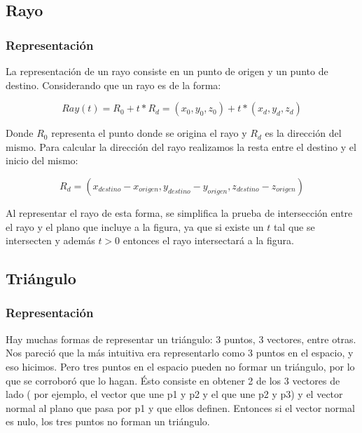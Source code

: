 \documentclass[a4paper,10pt]{article}
\begin{document}
\subsection{Rayo}

\subsubsection{Representaci\'on}

La representaci\'on de un rayo consiste en un punto de origen y un punto de destino.  Considerando que un rayo es de la forma:

\begin{center}
  \begin{equation}
    Ray (t) = R_0 + t * R_d = (x_0, y_0, z_0) + t * (x_d, y_d, z_d)
  \end{equation}
\end{center}

Donde $R_0$ representa el punto donde se origina el rayo y $R_d$ es la direcci\'on del mismo.  Para calcular la direcci\'on del rayo realizamos la resta entre el destino y el inicio del mismo:

\begin{center}
  \begin{equation}
   R_d = (x_{destino} - x_{origen}, y_{destino} - y_{origen}, z_{destino} - z_{origen})
  \end{equation}

\end{center}

Al representar el rayo de esta forma, se simplifica la prueba de intersecci\'on entre el rayo y el plano que incluye a la figura, ya que si existe un $t$ tal que se intersecten y adem\'as $t>0$ entonces el rayo intersectar\'a a la figura.

\subsection{Tri\'angulo}
\label{triangulo}
\subsubsection{Representaci\'on}

Hay muchas formas de representar un tri\'angulo: 3 puntos, 3 vectores, entre otras. Nos pareci\'o que la m\'as
intuitiva era representarlo como 3 puntos en el espacio, y eso hicimos. Pero tres puntos en el espacio pueden no
formar un triángulo, por lo que se corrobor\'o que lo hagan. \'Esto consiste en obtener 2 de los 3 vectores de lado
( por ejemplo, el vector que une p1 y p2 y el que une p2 y p3) y el vector normal al plano que pasa por p1 y que ellos definen.
Entonces si el vector normal es nulo, los tres puntos no forman un tri\'angulo.
\end{document}
